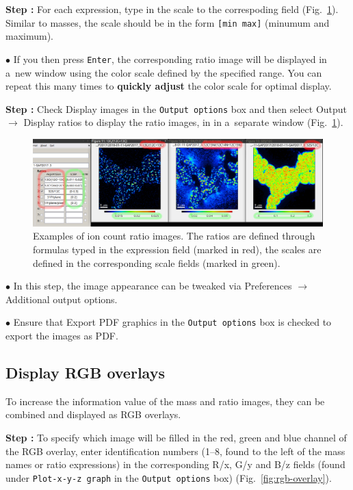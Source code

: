 \documentclass[a4paper, 11pt]{article}
\newcommand{\ttt}[1]{\texttt{#1}}
\newcommand{\lans}[1]{{\color{magenta}#1}}
\newcommand{\lanscb}[1]{{\color{darkgreen}#1}}
\newcommand{\lanstf}[1]{{\color{cyan}#1}}
\newcommand\ra{\rightarrow}
\newcounter{step}
\newcommand\s{\addtocounter{step}{1}\vskip5pt\noindent\textbf{Step \thestep:}{ }}
\newcommand\bul{\vskip5pt\noindent$\bullet${ }}
\newcommand\bb[1]{\textbf{#1}}
\begin{document}
\s For each expression, type in the \lanstf{scale} to the correspoding field (Fig.~\ref{fig:display-ratios}). Similar to masses, the scale should be in the form \ttt{[min max]} (minumum and maximum). 

\bul If you then press \ttt{Enter}, the corresponding ratio image will be displayed in a~new window using the color scale defined by the specified range. You can repeat this many times to \bb{quickly adjust} the color scale for optimal display.

\s Check \lanscb{Display images} in the \ttt{Output options} box and then select \lans{Output} $\ra$ \lans{Display ratios} to display the ratio images, in in a~separate window (Fig.~\ref{fig:display-ratios}). 

\begin{figure}[!ht]
\centering
\includegraphics[width=\textwidth]{figs3/LANS-display-ratios}
\caption{\label{fig:display-ratios}%
Examples of ion count ratio images. The ratios are defined through formulas typed in the \lanstf{expression} field (marked in red), the scales are defined in the corresponding \lanstf{scale} fields (marked in green).}
\end{figure}

\bul In this step, the image appearance can be tweaked via \lans{Preferences} $\ra$ \lans{Additional output options}.

\bul Ensure that \lanscb{Export PDF graphics} in the \ttt{Output options} box is checked to export the images as PDF.


\subsection{Display RGB overlays}
\setcounter{step}{0}

To increase the information value of the mass and ratio images, they can be combined and displayed as RGB overlays.

\s To specify which image will be filled in the red, green and blue channel of the RGB overlay, enter identification numbers (1--8, found to the left of the mass names or ratio expressions) in the corresponding \lanstf{R/x}, \lanstf{G/y} and \lanstf{B/z} fields (found under \ttt{Plot-x-y-z graph} in the \ttt{Output options} box) (Fig.~\ref{fig:rgb-overlay}).
\end{document}
